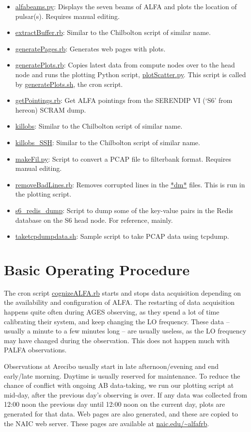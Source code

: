 \documentclass{article}
\begin{document}
\begin{itemize}
\item \url{alfabeams.py}: Displays the seven beams of ALFA and plots the
location of pulsar(s). Requires manual editing.
\item \url{extractBuffer.rb}: Similar to the Chilbolton script of similar name.
\item \url{generatePages.rb}: Generates web pages with plots.
\item \url{generatePlots.rb}: Copies latest data from compute nodes over to the
head node and runs the plotting Python script, \url{plotScatter.py}. This
script is called by \url{generatePlots.sh}, the cron script.
\item \url{getPointings.rb}: Get ALFA pointings from the SERENDIP VI (`S6' from
hereon) SCRAM dump.
\item \url{killobs}: Similar to the Chilbolton script of similar name.
\item \url{killobs_SSH}: Similar to the Chilbolton script of similar name.
\item \url{makeFil.py}: Script to convert a PCAP file to filterbank format.
Requires manual editing.
\item \url{removeBadLines.rb}: Removes corrupted lines in the \url{*dm*} files.
This is run in the plotting script.
\item \url{s6_redis_dump}: Script to dump some of the key-value pairs in the
Redis database on the S6 head node. For reference, mainly.
\item \url{taketcpdumpdata.sh}: Sample script to take PCAP data using tcpdump.
\end{itemize}


\section{Basic Operating Procedure}

The cron script \url{cognizeALFA.rb} starts and stops data acquisition
depending on the availability and configuration of ALFA. The restarting of data
acquisition happens quite often during AGES observing, as they spend a lot of
time calibrating their system, and keep changing the LO frequency. These data
-- usually a minute to a few minutes long -- are usually useless, as the LO
frequency may have changed during the observation. This does not happen much
with PALFA observations.

Observations at Arecibo usually start in late afternoon/evening and end
early/late morning. Daytime is usually reserved for maintenance. To reduce
the chance of conflict with ongoing AB data-taking, we run our plotting script
at mid-day, after the previous day's observing is over. If any data was
collected from 12:00 noon the previous day until 12:00 noon on the current day,
plots are generated for that data. Web pages are also generated, and these are
copied to the NAIC web server. These pages are available at
\url{naic.edu/~alfafrb}.
\end{document}
